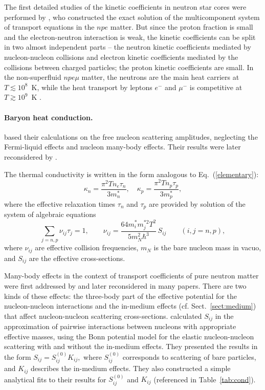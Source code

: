 \documentclass[smallextended]{svjour3}       %
\newcommand{\beq}{\begin{equation}}
\newcommand{\eeq}{\end{equation}}
\newcommand{\req}[1]{Eq.~(\ref{#1})}
\begin{document}
The first detailed studies of the kinetic coefficients in
neutron star cores were performed by \citet{FlowersItoh79},
who constructed the exact solution of the multicomponent
system of transport equations in the $npe$ matter. But since
the proton fraction is small and the electron-neutron
interaction is weak, the kinetic coefficients can be split
in two almost independent parts -- the neutron kinetic
coefficients mediated by nucleon-nucleon collisions and
electron kinetic coefficients mediated by the collisions
between charged particles; the proton kinetic coefficients
are small. In the non-superfluid $npe\mu$ matter, the
neutrons are the main heat carriers at $T\lesssim10^8$~K,
while the heat transport by leptons $e^-$ and $\mu^-$ is
competitive at $T\gtrsim10^9$~K
\citep{ShterninYakovlev07,ShterninBH13}.

\paragraph{Baryon heat conduction.}

\citet{FlowersItoh79} based their calculations on the free
nucleon scattering amplitudes, neglecting the Fermi-liquid
effects and nucleon many-body effects. Their results were
later reconsidered by \citet{BaikoHY01}.

The thermal conductivity is written in the form analogous to
\req{elementary}:
\beq
    \kappa_n= \frac{\pi^2 T n_e \tau_n }{ 3m_n^*},
 \quad
     \kappa_p=\frac{\pi^2 T n_p \tau_p}{3m_p^*},
\eeq
where the effective relaxation times $\tau_n$ and $\tau_p$
are provided by solution of the system of algebraic
equations \citep[e.g.,][]{ShterninBH13}
\beq
  \sum_{j=n,p}\nu_{ij} \tau_j=1,
\qquad
     \nu_{ij}= \frac{64 m_i^* m_j^{*2} T^2
        }{ 5 m_N^2 \hbar^3} \,S_{ij}
\qquad (i,j=n,p),
\eeq
where $\nu_{ij}$ are effective collision frequencies, $m_N$
is the bare nucleon mass in vacuo, and $S_{ij}$ are the effective
cross-sections.

Many-body effects in the context of transport coefficients
of pure neutron matter were first addressed by
\citet{WambachAP93} and later reconsidered in many papers.
There are two kinds of these effects: the three-body part of
the effective potential for the nucleon-nucleon interactions
and the in-medium effects (cf.{} Sect.~\ref{sect:medium})
that affect nucleon-nucleon
scattering cross-sections. \citet{BaikoHY01} calculated
$S_{ij}$ in the approximation of pairwise interactions
between nucleons with appropriate effective masses, using
the Bonn potential model for the elastic nucleon-nucleon
scattering \citep{Machleidt-ea87} with and without the
in-medium effects. They presented the results in the form $
S_{ij} = S_{ij}^{(0)}K_{ij}, $ where $S_{ij}^{(0)}$
corresponds to scattering of bare particles, and $K_{ij}$
describes the in-medium effects. They also constructed a simple
analytical fits to their results for $S_{ij}^{(0)}$ and
$K_{ij}$ (referenced in Table~\ref{tab:cond}).
\end{document}
